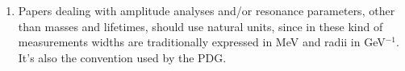 \begin{enumerate}
\item Papers dealing with amplitude analyses and/or resonance parameters, 
      other than masses and lifetimes, should use natural units,
      since in these kind of measurements widths are traditionally 
      expressed in MeV and radii in GeV$^{-1}$. It's also the convention
      used by the PDG. 
\end{enumerate}

